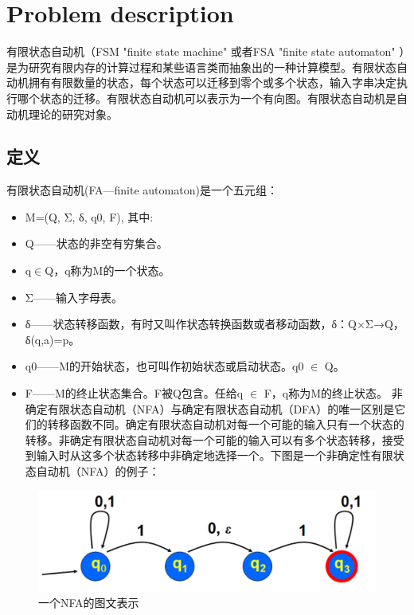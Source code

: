 \section{Problem description}
有限状态自动机（FSM "finite state machine" 或者FSA "finite state automaton" ）是为研究有限内存的计算过程和某些语言类而抽象出的一种计算模型。有限状态自动机拥有有限数量的状态，每个状态可以迁移到零个或多个状态，输入字串决定执行哪个状态的迁移。有限状态自动机可以表示为一个有向图。有限状态自动机是自动机理论的研究对象。 
\subsection{定义}
有限状态自动机(FA—finite automaton)是一个五元组：
\begin{itemize}
    \item M=(Q, Σ, δ, q0, F), 其中:
    \item Q——状态的非空有穷集合。
    \item q$\in$Q，q称为M的一个状态。
    \item Σ——输入字母表。
    \item δ——状态转移函数，有时又叫作状态转换函数或者移动函数，δ：Q×Σ→Q，δ(q,a)=p。
    \item q0——M的开始状态，也可叫作初始状态或启动状态。q0 $\in$  Q。
    \item F——M的终止状态集合。F被Q包含。任给q $\in$ F，q称为M的终止状态。
    非确定有限状态自动机（NFA）与确定有限状态自动机（DFA）的唯一区别是它们的转移函数不同。确定有限状态自动机对每一个可能的输入只有一个状态的转移。非确定有限状态自动机对每一个可能的输入可以有多个状态转移，接受到输入时从这多个状态转移中非确定地选择一个。下图是一个非确定性有限状态自动机（NFA）的例子：    
\end{itemize}

\begin{figure}[htbp]	%
    \centering
    \includegraphics[width=1\linewidth]{Figure/question.png}
    \caption{一个NFA的图文表示}
    \label{fig:figure1latexintro}
\end{figure}
